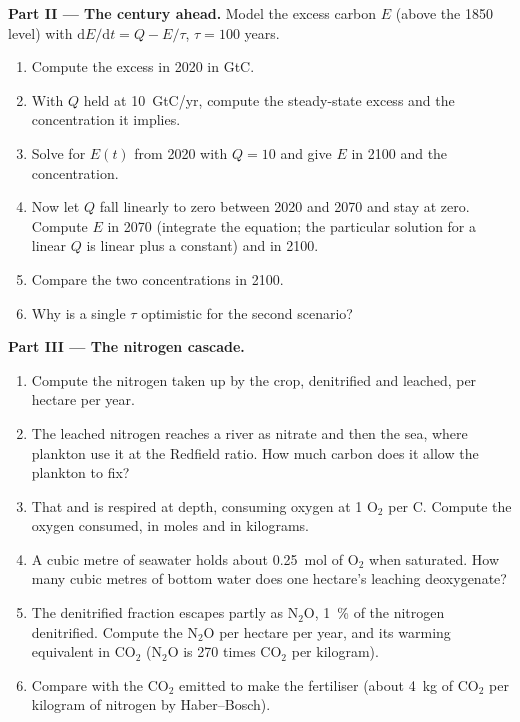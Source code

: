 \begin{problem}
\medskip
\noindent\textbf{Part II --- The century ahead.}
Model the excess carbon $E$ (above the 1850 level) with
$\mathrm{d}E/\mathrm{d}t = Q - E/\tau$, $\tau = 100$ years.
\begin{enumerate}[resume]
  \item Compute the excess in 2020 in GtC.
  \item With $Q$ held at \qty{10}{GtC/yr}, compute the steady-state
        excess and the concentration it implies.
  \item Solve for $E(t)$ from 2020 with $Q = 10$ and give $E$ in
        2100 and the concentration.
  \item Now let $Q$ fall linearly to zero between 2020 and 2070 and
        stay at zero. Compute $E$ in 2070 (integrate the equation;
        the particular solution for a linear $Q$ is linear plus a
        constant) and in 2100.
  \item Compare the two concentrations in 2100.
  \item Why is a single $\tau$ optimistic for the second scenario?
\end{enumerate}

\medskip
\noindent\textbf{Part III --- The nitrogen cascade.}
\begin{enumerate}[resume]
  \item Compute the nitrogen taken up by the crop, denitrified and
        leached, per hectare per year.
  \item The leached nitrogen reaches a river as nitrate and then the
        sea, where plankton use it at the Redfield ratio. How much
        carbon does it allow the plankton to fix?
  \item That  and is respired at depth, consuming
        oxygen at 1 $\mathrm{O_2}$ per C. Compute the oxygen consumed, in
        moles and in kilograms.
  \item A cubic metre of seawater holds about \qty{0.25}{mol} of
        $\mathrm{O_2}$ when saturated. How many cubic metres of bottom water
        does one hectare's leaching deoxygenate?
  \item The denitrified fraction escapes partly as $\mathrm{N_2O}$,
        \qty{1}{\%} of the nitrogen denitrified. Compute the $\mathrm{N_2O}$
        per hectare per year, and its warming equivalent in $\mathrm{CO_2}$
        ($\mathrm{N_2O}$ is 270 times $\mathrm{CO_2}$ per kilogram).
  \item Compare with the $\mathrm{CO_2}$ emitted to make the fertiliser
        (about \qty{4}{kg} of $\mathrm{CO_2}$ per kilogram of nitrogen by
        Haber--Bosch).
\end{enumerate}


\end{problem}
